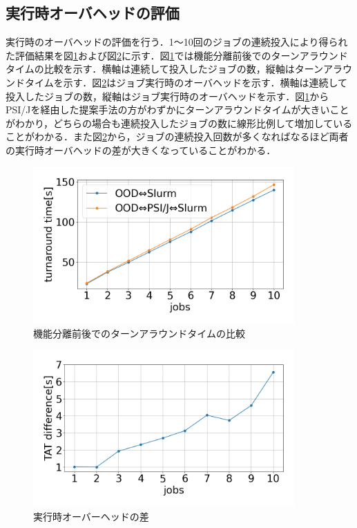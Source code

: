 \subsection{実行時オーバヘッドの評価}
実行時のオーバヘッドの評価を行う．1～10回のジョブの連続投入により得られた評価結果を図\ref{fig8}および図\ref{fig9}に示す．図\ref{fig8}では機能分離前後でのターンアラウンドタイムの比較を示す．横軸は連続して投入したジョブの数，縦軸はターンアラウンドタイムを示す．図\ref{fig9}はジョブ実行時のオーバヘッドを示す．横軸は連続して投入したジョブの数，縦軸はジョブ実行時のオーバヘッドを示す．図\ref{fig8}からPSI/Jを経由した提案手法の方がわずかにターンアラウンドタイムが大きいことがわかり，どちらの場合も連続投入したジョブの数に線形比例して増加していることがわかる．また図\ref{fig9}から，ジョブの連続投入回数が多くなればなるほど両者の実行時オーバヘッドの差が大きくなっていることがわかる．\par

\begin{figure}[tb]
    \centering
    \includegraphics[width=100mm]{./fig/ave_1-20.png}
    \caption{機能分離前後でのターンアラウンドタイムの比較}
    \label{fig8}
\end{figure}
  
\begin{figure}[tb]
    \centering
    \includegraphics[width=100mm]{./fig/ave_diff_1-20.png}
    \caption{実行時オーバーヘッドの差}
    \label{fig9}
\end{figure}


